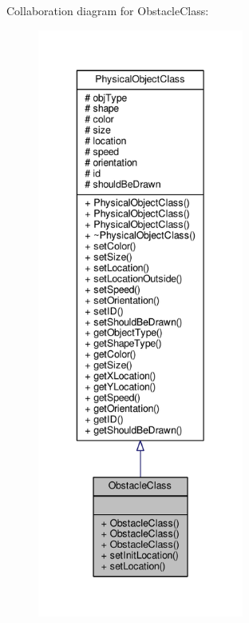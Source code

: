 Collaboration diagram for Obstacle\-Class\-:
\nopagebreak
\begin{figure}[H]
\begin{center}
\leavevmode
\includegraphics[height=550pt]{classObstacleClass__coll__graph}
\end{center}
\end{figure}
